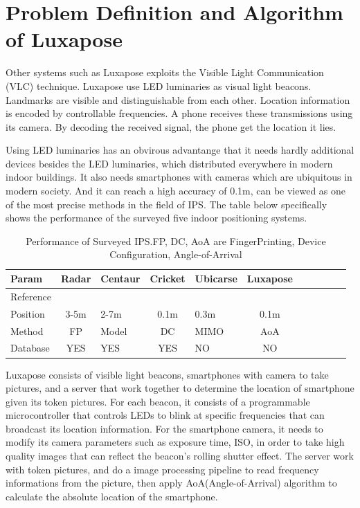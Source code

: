 \documentclass[a4paper, 11pt]{article} %
\begin{document}

\section{Problem Definition and Algorithm of Luxapose}
Other systems such as Luxapose exploits the Visible Light Communication (VLC) technique. Luxapose use LED luminaries as visual light beacons. Landmarks are visible and distinguishable from each other. Location information is encoded by controllable frequencies. A phone receives these transmissions using its camera. By decoding the received signal, the phone get the location it lies.

Using LED luminaries has an obvirous advantange that it needs hardly additional devices besides the LED luminaries, which distributed everywhere in modern indoor buildings. It also needs smartphones with cameras which are ubiquitous in modern society. And it can reach a high accuracy of 0.1m, can be viewed as one of the most precise methods in the field of IPS. The table below specifically shows the performance of the surveyed five indoor positioning systems.

\begin{table}[htbp]	
	\centering 
	\begin{tabular}{lclclclclcl}
		\toprule
		Param & Radar & Centaur & Cricket & Ubicarse & Luxapose \\
		\midrule
		Reference & \cite{Radar00} & \cite{Centaur12} & \cite{Cricket04} & \cite{Ubicarse14} & \cite{Luxapose14}\\
		Position & 3-5m & 2-7m & 0.1m & 0.3m & 0.1m\\
		Method & FP & Model & DC & MIMO & AoA\\
		Database & YES & YES & YES & NO & NO\\
		\bottomrule
	\end{tabular}
	\caption{\label{tab:test}Performance of Surveyed IPS.FP, DC, AoA are FingerPrinting, Device Configuration, Angle-of-Arrival}
\end{table}


Luxapose consists of visible light beacons, smartphones with camera to take pictures, and a server that work together to determine the location of smartphone given its token pictures. For each beacon, it consists of a programmable microcontroller that controls LEDs to blink at specific frequencies that can broadcast its location information. For the smartphone camera, it needs to modify its camera parameters such as exposure time, ISO, in order to take high quality images that can reflect the beacon's rolling shutter effect. The server work with token pictures, and do a image processing pipeline to read frequency informations from the picture, then apply AoA(Angle-of-Arrival) algorithm to calculate the absolute location of the smartphone.
\end{document}
